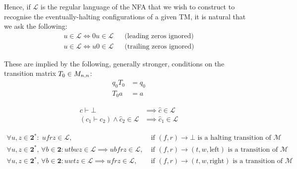  Hence, if $\mathcal{L}$ is the regular language of the NFA that we wish to construct to recognise the eventually-halting configurations of a given TM, it is natural that we ask the following:
\begin{align*}
  u \in \mathcal{L} \iff 0u \in \mathcal{L} && \text{(leading zeros ignored)}
  \\
  u \in \mathcal{L} \iff u0 \in \mathcal{L} && \text{(trailing zeros ignored)}
\end{align*}

These are implied by the following, generally stronger, conditions on the transition matrix $T_0 \in M_{n,n}$:
\begin{align}
  q_0 T_0 &= q_0
  \label{far-cond-leading-0}
  \\
  T_0 a &= a
  \label{far-cond-trailing-0}
\end{align}







\begin{align*}
c\vdash\bot &\implies \hat{c} \in \mathcal{L}\\
(c_1\vdash c_2)\land \hat{c}_2 \in \mathcal{L}&\implies\hat{c}_1 \in \mathcal{L}
\end{align*}

\begin{align*}
  \forall u,z\in\mathbf{2}^*: \; ufrz \in \mathcal{L},\;& \text{if $(f,r) \to \bot$ is a halting transition of $\mathcal{M}$}
  \\
  \forall u,z\in\mathbf{2}^*,\,\forall b \in \mathbf{2}: utbwz \in \mathcal{L} \implies ubfrz \in \mathcal{L},\;& \text{if $(f,r) \to (t,w,\text{left})$ is a transition of $\mathcal{M}$}
  \\
  \forall u,z\in\mathbf{2}^*,\,\forall b \in \mathbf{2}: u w t z \in \mathcal{L} \implies u f r z \in \mathcal{L},\;& \text{if $(f,r) \to (t,w,\text{right})$ is a transition of $\mathcal{M}$}
\end{align*}

